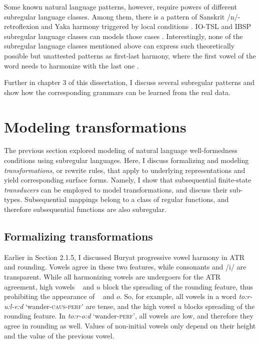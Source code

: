 Some known natural language patterns, however, require powers of different subregular language classes.
Among them, there is a pattern of Sanskrit /n/-retroflexion and Yaka harmony triggered by local conditions \citep{Walker2000,McMullin2016,Karakas2020}.
IO-TSL and IBSP subregular language classes can models those cases \citep{Graf17Phonology,Graf18NELS}.
Interestingly, none of the subregular language classes mentioned above can express such theoretically possible but unattested patterns as first-last harmony, where the first vowel of the word needs to harmonize with the last one \citep{Avcu2017Experiment}.


Further in chapter 3 of this dissertation, I discuss several subregular patterns and show how the corresponding grammars can be learned from the real data.










\section{Modeling transformations}

The previous section explored modeling of natural language well-formedness conditions using subregular languages.
Here, I discuss formalizing and modeling \emph{transformations}, or rewrite rules, that apply to underlying representations and yield corresponding surface forms.
Namely, I show that subsequential finite-state \emph{transducers} can be employed to model transformations, and discuss their sub-types.
Subsequential mappings belong to a class of regular functions, and therefore subsequential functions are also subregular.

\subsection{Formalizing transformations}
\label{FSTforburyat}

Earlier in Section 2.1.5, I discussed Buryat progressive vowel harmony in ATR and rounding.
Vowels agree in these two features, while consonants and /i/ are transparent.
While all harmonizing vowels are undergoers for the ATR agreement, high vowels \textupsilon~ and $u$ block the spreading of the rounding feature, thus prohibiting the appearance of \textopeno~ and $o$.
So, for example, all vowels in a word \emph{to:r-u:l-e:d} `wander-\textsc{caus-perf}' are tense, and the high vowel $u$ blocks spreading of the rounding feature.
In \emph{to:r-o:d} `wander-\textsc{perf}', all vowels are low, and therefore they agree in rounding as well.
Values of non-initial vowels only depend on their height and the value of the previous vowel.

